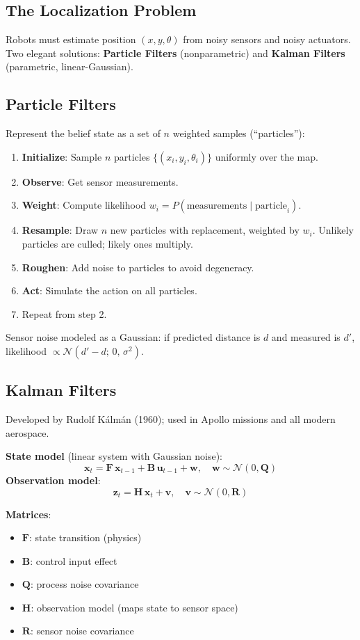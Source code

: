 \documentclass[11pt]{article}
\begin{document}
\subsection{The Localization Problem}
Robots must estimate position $(x, y, \theta)$ from noisy sensors and noisy actuators. Two elegant solutions: \textbf{Particle Filters} (nonparametric) and \textbf{Kalman Filters} (parametric, linear-Gaussian).

\subsection{Particle Filters}
Represent the belief state as a set of $n$ weighted samples (``particles''):

\begin{enumerate}
  \item \textbf{Initialize}: Sample $n$ particles $\{(x_i, y_i, \theta_i)\}$ uniformly over the map.
  \item \textbf{Observe}: Get sensor measurements.
  \item \textbf{Weight}: Compute likelihood $w_i = P(\text{measurements} \mid \text{particle}_i)$.
  \item \textbf{Resample}: Draw $n$ new particles with replacement, weighted by $w_i$. Unlikely particles are culled; likely ones multiply.
  \item \textbf{Roughen}: Add noise to particles to avoid degeneracy.
  \item \textbf{Act}: Simulate the action on all particles.
  \item Repeat from step 2.
\end{enumerate}
Sensor noise modeled as a Gaussian: if predicted distance is $d$ and measured is $d'$, likelihood $\propto \mathcal{N}(d' - d;\, 0,\, \sigma^2)$.

\subsection{Kalman Filters}
Developed by Rudolf Kálmán (1960); used in Apollo missions and all modern aerospace.

\textbf{State model} (linear system with Gaussian noise):
\[
  \mathbf{x}_t = \mathbf{F}\,\mathbf{x}_{t-1} + \mathbf{B}\,\mathbf{u}_{t-1} + \mathbf{w}, \quad \mathbf{w} \sim \mathcal{N}(0, \mathbf{Q})
\]
\textbf{Observation model}:
\[
  \mathbf{z}_t = \mathbf{H}\,\mathbf{x}_t + \mathbf{v}, \quad \mathbf{v} \sim \mathcal{N}(0, \mathbf{R})
\]

\textbf{Matrices}:
\begin{itemize}
  \item $\mathbf{F}$: state transition (physics)
  \item $\mathbf{B}$: control input effect
  \item $\mathbf{Q}$: process noise covariance
  \item $\mathbf{H}$: observation model (maps state to sensor space)
  \item $\mathbf{R}$: sensor noise covariance
\end{itemize}
\end{document}

